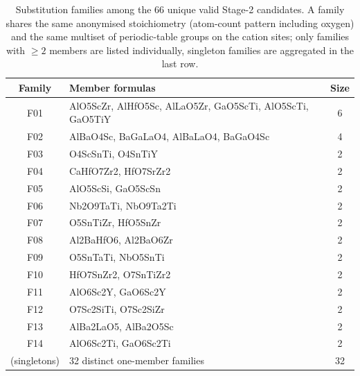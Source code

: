 \begin{table}[htbp]
\centering
\caption{Substitution families among the 66 unique valid Stage-2 candidates. A family shares the same anonymised stoichiometry (atom-count pattern including oxygen) and the same multiset of periodic-table groups on the cation sites; only families with $\geq 2$ members are listed individually, singleton families are aggregated in the last row.}
\label{tab:a3_families}
\begin{tabular}{clc}
\toprule
Family & Member formulas & Size \\
\midrule
F01 & AlO5ScZr, AlHfO5Sc, AlLaO5Zr, GaO5ScTi, AlO5ScTi, GaO5TiY & 6 \\
F02 & AlBaO4Sc, BaGaLaO4, AlBaLaO4, BaGaO4Sc & 4 \\
F03 & O4ScSnTi, O4SnTiY & 2 \\
F04 & CaHfO7Zr2, HfO7SrZr2 & 2 \\
F05 & AlO5ScSi, GaO5ScSn & 2 \\
F06 & Nb2O9TaTi, NbO9Ta2Ti & 2 \\
F07 & O5SnTiZr, HfO5SnZr & 2 \\
F08 & Al2BaHfO6, Al2BaO6Zr & 2 \\
F09 & O5SnTaTi, NbO5SnTi & 2 \\
F10 & HfO7SnZr2, O7SnTiZr2 & 2 \\
F11 & AlO6Sc2Y, GaO6Sc2Y & 2 \\
F12 & O7Sc2SiTi, O7Sc2SiZr & 2 \\
F13 & AlBa2LaO5, AlBa2O5Sc & 2 \\
F14 & AlO6Sc2Ti, GaO6Sc2Ti & 2 \\
(singletons) & 32 distinct one-member families & 32 \\
\bottomrule
\end{tabular}
\end{table}
